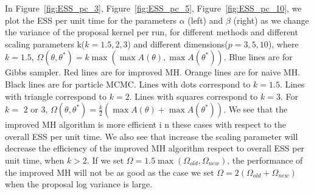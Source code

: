  In Figure~\ref{fig:ESS_pc_3}, Figure~\ref{fig:ESS_pc_5}, Figure~\ref{fig:ESS_pc_10}, we plot the ESS per unit time for the parameters $\alpha$ (left) and $\beta$ (right) as we change the variance of the
  proposal kernel per run, for different methods and different scaling parameters k($k = 1.5, 2, 3$) and different dimensions($p = 3, 5, 10$), where   $k = 1.5$,  $\Omega(\theta, \theta^*) = k \max(\max A(\theta), \max A(\theta^*))$. Blue lines are for Gibbs sampler. Red lines are for improved MH. Orange lines are for naive MH. Black lines are for particle MCMC. Lines with dots correspond to $k = 1.5$. Lines with triangle correspond to $k = 2$. Lines with squares correspond to $k = 3$. For $k=$ $2$ or $3$, $\Omega(\theta, \theta^*) = \frac{k}{2} (\max A(\theta) + \max A(\theta^*))$. We see that the improved MH algorithm is more efficient i	n these cases with respect to the overall ESS per unit time. We also see that increase the scaling parameter will decrease the efficiency of the improved MH algorithm respect to overall ESS per unit time, when $k > 2$. If we set $\Omega = 1.5 \max(\Omega_{old}, \Omega_{new})$, the performance of the improved MH will not be as good as the case we set $\Omega = 2(\Omega_{old} + \Omega_{new})$ when the proposal log variance is large.\\

